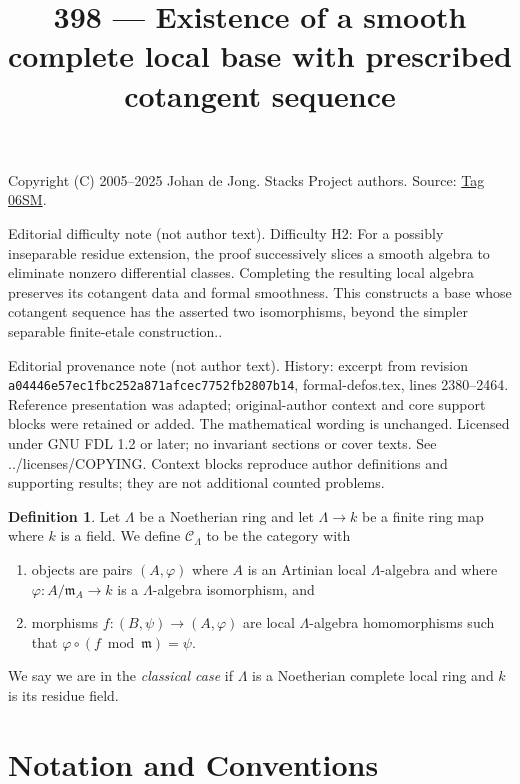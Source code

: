 \documentclass{amsart}
\theoremstyle{plain}
\theoremstyle{definition}
\newtheorem{definition}[subsection]{Definition}
\theoremstyle{remark}
\numberwithin{equation}{subsection}
\begin{document}
\title[Stacks Project, Tag 06SM]{398 --- Existence of a smooth complete local base with prescribed cotangent sequence}
\maketitle
\noindent Copyright (C) 2005--2025 Johan de Jong. Stacks Project authors. Source: \href{https://stacks.math.columbia.edu/tag/06SM}{Tag 06SM}.

\noindent Editorial difficulty note (not author text). Difficulty H2: For a possibly inseparable residue extension, the proof successively slices a smooth algebra to eliminate nonzero differential classes. Completing the resulting local algebra preserves its cotangent data and formal smoothness. This constructs a base whose cotangent sequence has the asserted two isomorphisms, beyond the simpler separable finite-etale construction..

\noindent Editorial provenance note (not author text). History: excerpt from revision \texttt{a0444\allowbreak 6e57e\allowbreak c1fbc\allowbreak 252a8\allowbreak 71afc\allowbreak ec775\allowbreak 2fb28\allowbreak 07b14}, formal-defos.tex, lines 2380--2464. Reference presentation was adapted; original-author context and core support blocks were retained or added. The mathematical wording is unchanged. Licensed under GNU FDL 1.2 or later; no invariant sections or cover texts. See ../licenses/COPYING. Context blocks reproduce author definitions and supporting results; they are not additional counted problems.

\begin{definition}
\label{definition-CLambda}
Let $\Lambda$ be a Noetherian ring and let $\Lambda \to k$ be a finite
ring map where $k$ is a field. We define {\it $\mathcal{C}_\Lambda$} to be
the category with
\begin{enumerate}
\item objects are pairs $(A, \varphi)$ where $A$ is an Artinian local
$\Lambda$-algebra and where $\varphi : A/\mathfrak m_A \to k$ is a
$\Lambda$-algebra isomorphism, and
\item morphisms $f : (B, \psi) \to (A, \varphi)$ are local $\Lambda$-algebra
homomorphisms such that $\varphi \circ (f \bmod \mathfrak m) = \psi$.
\end{enumerate}
We say we are in the {\it classical case} if $\Lambda$ is a Noetherian
complete local ring and $k$ is its residue field.
\end{definition}

\section{Notation and Conventions}
\label{section-notations-conventions}
\end{document}
